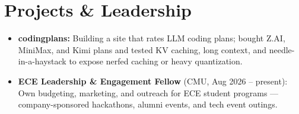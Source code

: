 \documentclass[11pt, letterpaper]{article}
\begin{document}
\section{Projects \& Leadership}
\begin{itemize}
  \item \textbf{codingplans:} Building a site that rates LLM coding plans; bought Z.AI, MiniMax, and Kimi plans and tested KV caching, long context, and needle-in-a-haystack to expose nerfed caching or heavy quantization.
  \item \textbf{ECE Leadership \& Engagement Fellow} (CMU, Aug 2026 -- present): Own budgeting, marketing, and outreach for ECE student programs --- company-sponsored hackathons, alumni events, and tech event outings.
\end{itemize}
\end{document}
